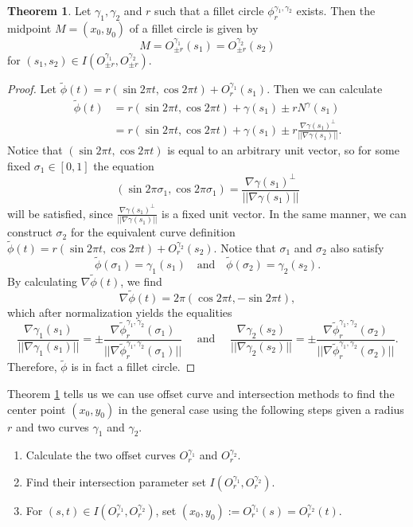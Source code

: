 \documentclass[a4paper, 11pt]{report}
\theoremstyle{definition}
\newtheorem{theorem}[definition]{Theorem}
\begin{document}
	\begin{theorem}\label{thm:fillettheorem}
		Let $\gamma_1, \gamma_2$ and $r$ such that a fillet circle $\phi^{\gamma_1, \gamma_2}_r$ exists. Then the midpoint $M = (x_0, y_0)$ of a fillet circle is given by
			$$ M = O^{\gamma_1}_{\pm r}(s_1) = O^{\gamma_2}_{\pm r}(s_2) $$
		for $(s_1,s_2) \in I(O^{\gamma_1}_{\pm r}, O^{\gamma_2}_{\pm r})$.
	\end{theorem}
	\begin{proof}
		Let $\tilde\phi(t) = r (\sin 2\pi t, \cos 2\pi t) + O^{\gamma_1}_r(s_1)$. Then we can calculate
		\begin{align*}
			\tilde\phi(t) 	&= r (\sin 2\pi t, \cos 2\pi t) + \gamma(s_1) \pm rN^\gamma(s_1) \\
							&= r (\sin 2\pi t, \cos 2\pi t) + \gamma(s_1) \pm r\frac{\nabla\gamma(s_1)^\perp}{||\nabla\gamma(s_1)||}.
		\end{align*}
		Notice that $(\sin 2\pi t, \cos 2\pi t)$ is equal to an arbitrary unit vector, so for some fixed $\sigma_1 \in [0,1]$ the equation
			$$(\sin 2\pi \sigma_1, \cos 2\pi \sigma_1) = \frac{\nabla\gamma(s_1)^\perp}{||\nabla\gamma(s_1)||}$$
		will be satisfied, since $\frac{\nabla\gamma(s_1)^\perp}{||\nabla\gamma(s_1)||}$ is a fixed unit vector.
		In the same manner, we can construct $\sigma_2$ for the equivalent curve definition $\tilde\phi(t) = r (\sin 2\pi t, \cos 2\pi t) + O^{\gamma_2}_r(s_2).$ Notice that $\sigma_1$ and $\sigma_2$ also satisfy
			$$ \tilde\phi(\sigma_1) = \gamma_1(s_1) \quad\text{and}\quad \tilde\phi(\sigma_2) = \gamma_2(s_2).$$
		By calculating $\nabla \tilde\phi(t)$, we find
			$$ \nabla \tilde\phi(t) = 2\pi (\cos 2\pi t, -\sin 2\pi t), $$
		which after normalization yields the equalities
			$$
				\frac{\nabla \gamma_1(s_1)}{||\nabla \gamma_1(s_1)||} = 
				\pm\frac{\nabla \tilde\phi^{\gamma_1, \gamma_2}_r(\sigma_1)}{||\nabla \tilde\phi^{\gamma_1, \gamma_2}_r(\sigma_1)||} 
				\quad\text{ and }\quad 
				\frac{\nabla \gamma_2(s_2)}{||\nabla \gamma_2(s_2)||} =  
				\pm\frac{\nabla \tilde\phi^{\gamma_1, \gamma_2}_r(\sigma_2)}{||\nabla \tilde\phi^{\gamma_1, \gamma_2}_r(\sigma_2)||}.
			$$
		Therefore, $\tilde \phi$ is in fact a fillet circle.
	\end{proof}

	Theorem \ref{thm:fillettheorem} tells us we can use offset curve and intersection methods to find the center point $(x_0, y_0)$ in the general case using the following steps given a radius $r$ and two curves $\gamma_1$ and $\gamma_2$.
	\begin{enumerate}
		\item Calculate the two offset curves $O^{\gamma_1}_r$ and $O^{\gamma_2}_r$.
		\item Find their intersection parameter set $I(O^{\gamma_1}_r, O^{\gamma_2}_r)$.
		\item For $(s,t) \in I(O^{\gamma_1}_r, O^{\gamma_2}_r)$, set $(x_0, y_0) := O^{\gamma_1}_r(s) = O^{\gamma_2}_r(t)$.
	\end{enumerate}
\end{document}
